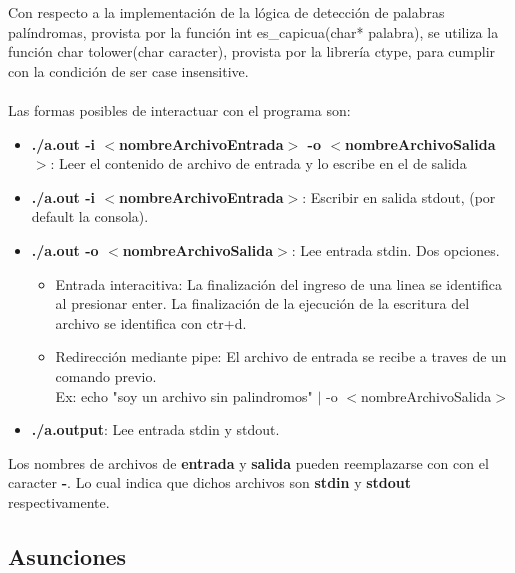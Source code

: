 \documentclass[a4paper,10pt]{article}
\begin{document}
Con respecto a la implementaci\'on de la l\'ogica de detecci\'on de palabras
pal\'indromas, provista por la funci\'on int es\_capicua(char* palabra),
se utiliza la funci\'on char tolower(char caracter), provista por la
librer\'ia ctype, para cumplir con la condici\'on de ser case insensitive.\\
\\
Las formas posibles de interactuar con el programa son:
\begin{itemize}
	\item \textbf{./a.out -i $<$nombreArchivoEntrada$>$ -o $<$nombreArchivoSalida$>$}:
	Leer el contenido de archivo de entrada y lo escribe en el de salida
	\item \textbf{./a.out -i $<$nombreArchivoEntrada$>$}:
	Escribir en salida stdout, (por default la consola).
	\item \textbf{./a.out -o $<$nombreArchivoSalida$>$}:
	Lee entrada stdin. Dos opciones.
	\begin{itemize}
		\item Entrada interacitiva: La finalizaci\'on del ingreso
		de una linea se identifica al presionar enter. La
		finalizaci\'on de la ejecuci\'on de la escritura del
		archivo se identifica con ctr+d.
		\item Redirecci\'on mediante pipe: El archivo de entrada se
		recibe a traves de un comando previo.\\
		Ex: echo "soy un archivo sin palindromos" $|$ -o $<$nombreArchivoSalida$>$
	\end{itemize}
	\item \textbf{./a.output}: Lee entrada stdin y stdout.
\end{itemize}

Los nombres de archivos de \textbf{entrada} y \textbf{salida} pueden reemplazarse con con el
caracter \textbf{-}. Lo cual indica que dichos archivos son \textbf{stdin}
y \textbf{stdout} respectivamente.

\subsection{Asunciones}
\end{document}
